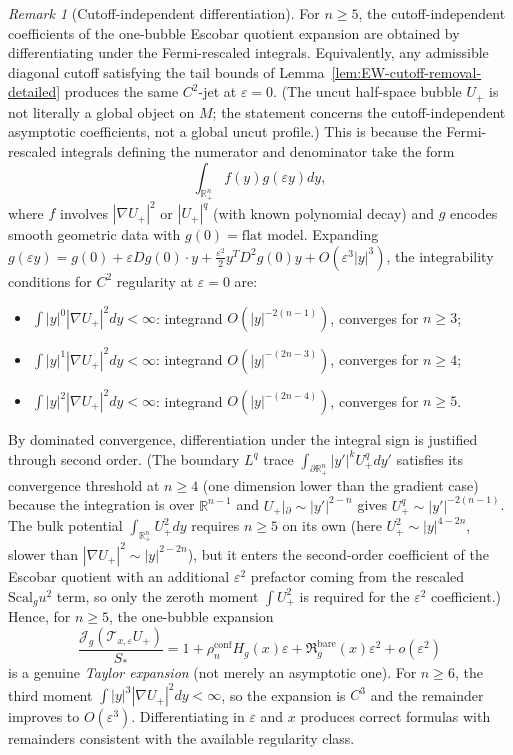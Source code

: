 \documentclass[11pt,reqno,a4paper]{amsart}
\newcommand{\R}{\mathbb{R}}
\numberwithin{equation}{section}
\theoremstyle{plain}
\newcommand{\Scal}{\mathrm{Scal}}
\theoremstyle{remark}
\newtheorem{remark}[theorem]{Remark}
\theoremstyle{plain}
\begin{document}
\begin{remark}[Cutoff-independent differentiation]\label{conv:fixed-cutoff}
For $n\ge5$, the cutoff-independent coefficients of the one-bubble Escobar
quotient expansion are obtained by differentiating under the Fermi-rescaled
integrals.  Equivalently, any admissible diagonal cutoff satisfying the tail
bounds of Lemma~\ref{lem:EW-cutoff-removal-detailed} produces the same $C^2$-jet
at $\varepsilon=0$.  (The uncut half-space bubble $U_+$ is not literally a global
object on $M$; the statement concerns the cutoff-independent asymptotic
coefficients, not a global uncut profile.)
This is because the Fermi-rescaled integrals defining the numerator and denominator
take the form
\[
\int_{\mathbb R^n_+} f(y)g(\varepsilon y)dy,
\]
where $f$ involves $|\nabla U_+|^2$ or $|U_+|^q$ (with known polynomial decay)
and $g$ encodes smooth geometric data with $g(0)=\text{flat model}$.
Expanding $g(\varepsilon y)=g(0)+\varepsilon Dg(0)\cdot y+\tfrac{\varepsilon^2}{2}y^TD^2g(0)y+O(\varepsilon^3|y|^3)$,
the integrability conditions for $C^2$ regularity at $\varepsilon=0$ are:
\begin{itemize}[leftmargin=1.5em]
\item $\int|y|^0|\nabla U_+|^2dy<\infty$: integrand $O(|y|^{-2(n-1)})$, converges for $n\ge3$;
\item $\int|y|^1|\nabla U_+|^2dy<\infty$: integrand $O(|y|^{-(2n-3)})$, converges for $n\ge4$;
\item $\int|y|^2|\nabla U_+|^2dy<\infty$: integrand $O(|y|^{-(2n-4)})$, converges for $n\ge5$.
\end{itemize}
By dominated convergence, differentiation under the integral sign is justified
through second order.
(The boundary $L^q$ trace
$\int_{\partial\mathbb R^n_+}|y'|^k U_+^qdy'$
satisfies its convergence threshold at $n\ge4$ (one dimension lower than the gradient
case) because the integration is over $\R^{n-1}$ and $U_+|_{\partial}\sim|y'|^{2-n}$
gives $U_+^q\sim|y'|^{-2(n-1)}$.
The bulk potential $\int_{\mathbb R^n_+}U_+^2dy$ requires $n\ge5$ on its own
(here $U_+^2\sim|y|^{4-2n}$, slower than $|\nabla U_+|^2\sim|y|^{2-2n}$),
but it enters the second-order coefficient of the Escobar quotient with an additional
$\varepsilon^2$ prefactor coming from the rescaled $\Scal_g u^2$ term, so only the
zeroth moment $\int U_+^2$ is required for the $\varepsilon^2$ coefficient.)
Hence, for $n\ge5$, the one-bubble expansion
\[
\frac{\mathcal J_g(\mathcal T_{x,\varepsilon}U_+)}{S_\ast}
=1+\rho_n^{\mathrm{conf}}H_g(x)\varepsilon+\mathfrak R_g^{\mathrm{bare}}(x)\varepsilon^2
+o(\varepsilon^2)
\]
is a genuine \emph{Taylor expansion} (not merely an asymptotic one).
For $n\ge6$, the third moment $\int|y|^3|\nabla U_+|^2dy<\infty$,
so the expansion is $C^3$ and the remainder improves to $O(\varepsilon^3)$.
Differentiating in $\varepsilon$ and $x$ produces correct formulas
with remainders consistent with the available regularity class.


\end{remark}
\end{document}
